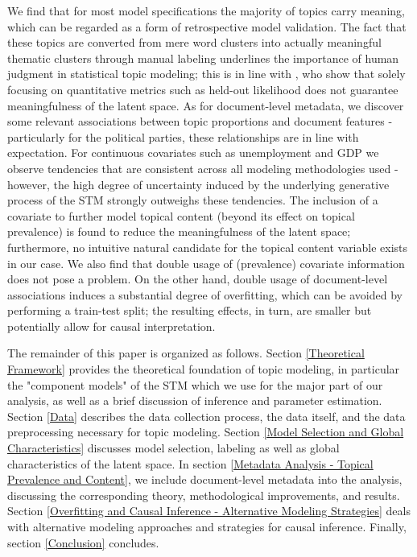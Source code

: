We find that for most model specifications the majority of topics carry meaning, which can be regarded as a form of retrospective model validation. The fact that these topics are converted from mere word clusters into actually meaningful thematic clusters through manual labeling underlines the importance of human judgment in statistical topic modeling; this is in line with \cite{chang2009reading}, who show that solely focusing on quantitative metrics such as held-out likelihood does not guarantee meaningfulness of the latent space. As for document-level metadata, we discover some relevant associations between topic proportions and document features - particularly for the political parties, these relationships are in line with expectation. For continuous covariates such as unemployment and GDP we observe tendencies that are consistent across all modeling methodologies used - however, the high degree of uncertainty induced by the underlying generative process of the STM strongly outweighs these tendencies. The inclusion of a covariate to further model topical content (beyond its effect on topical prevalence) is found to reduce the meaningfulness of the latent space; furthermore, no intuitive natural candidate for the topical content variable exists in our case. We also find that double usage of (prevalence) covariate information does not pose a problem. On the other hand, double usage of document-level associations induces a substantial degree of overfitting, which can be avoided by performing a train-test split; the resulting effects, in turn, are smaller but potentially allow for causal interpretation.

The remainder of this paper is organized as follows. Section \ref{Theoretical Framework} provides the theoretical foundation of topic modeling, in particular the "component models" of the STM which we use for the major part of our analysis, as well as a brief discussion of inference and parameter estimation. Section \ref{Data} describes the data collection process, the data itself, and the data preprocessing necessary for topic modeling. Section \ref{Model Selection and Global Characteristics} discusses model selection, labeling as well as global characteristics of the latent space. In section \ref{Metadata Analysis - Topical Prevalence and Content}, we include document-level metadata into the analysis, discussing the corresponding theory, methodological improvements, and results. Section \ref{Overfitting and Causal Inference - Alternative Modeling Strategies} deals with alternative modeling approaches and strategies for causal inference. Finally, section \ref{Conclusion} concludes.